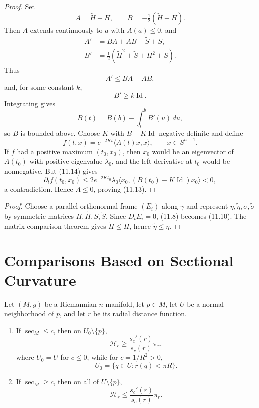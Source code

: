 \begin{proof}
\sketch
Set
\[
A=\widetilde H-H,
\qquad
B=-\tfrac12(\widetilde H+H).
\]
Then $A$ extends continuously to $a$ with $A(a)\leq0$, and
\begin{align*}
A'&=BA+AB-\widetilde S+S,\\
B'&=\tfrac12(\widetilde H^2+\widetilde S+H^2+S).
\end{align*}
Thus
\begin{equation}
A'\leq BA+AB, \tag{11.14}
\end{equation}
and, for some constant $k$,
\begin{equation}
B'\geq k\operatorname{Id}. \tag{11.15}
\end{equation}
Integrating gives
\begin{equation}
B(t)=B(b)-\int_t^bB'(u)\,du, \tag{11.16}
\end{equation}
so $B$ is bounded above.  Choose $K$ with $B-K\operatorname{Id}$ negative
definite and define
\[
f(t,x)=e^{-2Kt}\langle A(t)x,x\rangle,
\qquad x\in S^{n-1}.
\]
If $f$ had a positive maximum $(t_0,x_0)$, then $x_0$ would be an eigenvector
of $A(t_0)$ with positive eigenvalue $\lambda_0$, and the left derivative at
$t_0$ would be nonnegative.  But (11.14) gives
\[
\partial_tf(t_0,x_0)
\leq2e^{-2Kt_0}\lambda_0
\langle x_0,(B(t_0)-K\operatorname{Id})x_0\rangle<0,
\]
a contradiction.  Hence $A\leq0$, proving (11.13).
\end{proof}

\begin{proof}
\sketch
Choose a parallel orthonormal frame $(E_i)$ along $\gamma$ and represent
$\eta,\widetilde\eta,\sigma,\widetilde\sigma$ by symmetric matrices
$H,\widetilde H,S,\widetilde S$.  Since $D_tE_i=0$, (11.8) becomes (11.10).
The matrix comparison theorem gives $\widetilde H\leq H$, hence
$\widetilde\eta\leq\eta$.
\end{proof}
\section{Comparisons Based on Sectional Curvature}

\begin{theorem}
\label{thm:hessian-comparison}

Let $(M,g)$ be a Riemannian $n$-manifold, let $p\in M$, let $U$ be a normal
neighborhood of $p$, and let $r$ be its radial distance function.
\begin{enumerate}
\item[(a)] If $\sec_M\leq c$, then on $U_0\setminus\{p\}$,
\begin{equation}
\mathcal H_r\geq\frac{s_c'(r)}{s_c(r)}\pi_r, \tag{11.17}
\end{equation}
where $U_0=U$ for $c\leq0$, while for $c=1/R^2>0$,
\[
U_0=\{q\in U:r(q)<\pi R\}.
\]
\item[(b)] If $\sec_M\geq c$, then on all of $U\setminus\{p\}$,
\begin{equation}
\mathcal H_r\leq\frac{s_c'(r)}{s_c(r)}\pi_r. \tag{11.18}
\end{equation}
\end{enumerate}
\end{theorem}

